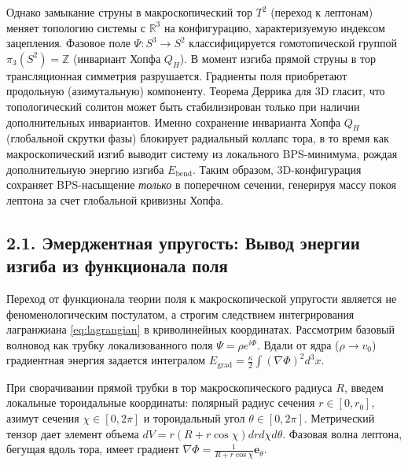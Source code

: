 \documentclass[12pt,a4paper]{article}
\begin{document}
Однако замыкание струны в макроскопический тор $T^2$ (переход к лептонам) меняет топологию системы с $\mathbb{R}^3$ на конфигурацию, характеризуемую индексом зацепления. Фазовое поле $\Psi: S^3 \to S^2$ классифицируется гомотопической группой $\pi_3(S^2) = \mathbb{Z}$ (инвариант Хопфа $Q_H$).
В момент изгиба прямой струны в тор трансляционная симметрия разрушается. Градиенты поля приобретают продольную (азимутальную) компоненту. Теорема Деррика для 3D гласит, что топологический солитон может быть стабилизирован только при наличии дополнительных инвариантов. Именно сохранение инварианта Хопфа $Q_H$ (глобальной скрутки фазы) блокирует радиальный коллапс тора, в то время как макроскопический изгиб выводит систему из локального BPS-минимума, рождая дополнительную энергию изгиба $E_{\text{bend}}$. Таким образом, 3D-конфигурация сохраняет BPS-насыщение \textit{только} в поперечном сечении, генерируя массу покоя лептона за счет глобальной кривизны Хопфа.

\subsection{2.1. Эмерджентная упругость: Вывод энергии изгиба из функционала поля}
Переход от функционала теории поля к макроскопической упругости является не феноменологическим постулатом, а строгим следствием интегрирования лагранжиана \eqref{eq:lagrangian} в криволинейных координатах.
Рассмотрим базовый волновод как трубку локализованного поля $\Psi = \rho e^{i\Phi}$. Вдали от ядра ($\rho \to v_0$) градиентная энергия задается интегралом $E_{\text{grad}} = \frac{\kappa}{2} \int (\nabla \Phi)^2 d^3x$.

При сворачивании прямой трубки в тор макроскопического радиуса $R$, введем локальные тороидальные координаты: полярный радиус сечения $r \in [0, r_0]$, азимут сечения $\chi \in [0, 2\pi]$ и тороидальный угол $\theta \in [0, 2\pi]$. Метрический тензор дает элемент объема $dV = r(R + r\cos\chi) dr d\chi d\theta$.
Фазовая волна лептона, бегущая вдоль тора, имеет градиент $\nabla \Phi = \frac{1}{R + r\cos\chi} \mathbf{e}_\theta$.
\end{document}

